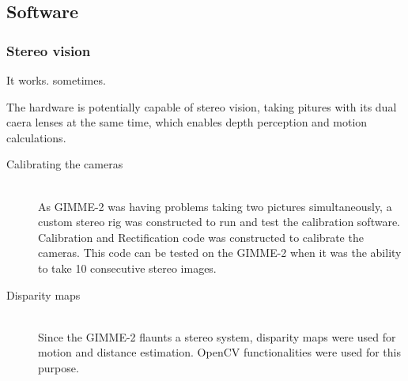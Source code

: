 \subsection{Software}
\subsubsection{Stereo vision}
It works. sometimes.

The hardware is potentially capable of stereo vision, taking pitures with its dual caera lenses at the same time, which enables depth perception and motion calculations.

\begin{description}
  \item [Calibrating the cameras] \hfill \\As GIMME-2 was having problems taking two pictures simultaneously, a custom stereo rig was constructed to run and test the calibration software. Calibration and Rectification code was constructed to calibrate the cameras. This code can be tested on the GIMME-2 when it was the ability to take 10 consecutive stereo images.
  \item [Disparity maps] \hfill \\Since the GIMME-2 flaunts a stereo system, disparity maps were used for motion and distance estimation. OpenCV functionalities were used for this purpose.

\end{description}


